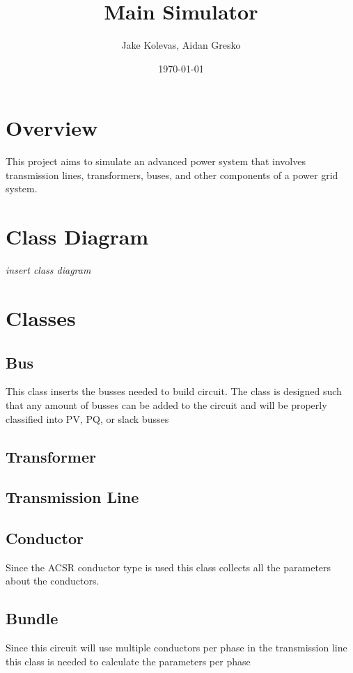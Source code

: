 \documentclass{article}
\author{Jake Kolevas, Aidan Gresko}
\title{Main Simulator}
\date{\today}
\begin{document}
	\maketitle
	
	\section{Overview}
	This project aims to simulate an advanced power system that involves transmission lines, transformers, buses, and other components of a power grid system.
	
	\section{Class Diagram}
	
	\textit{insert class diagram}
	
	\section{Classes}
	
	\subsection{Bus}
	This class inserts the busses needed to build circuit. The class is designed such that any amount of busses can be added to the circuit and will be properly classified into PV, PQ, or slack busses
	
	\subsection{Transformer}
	
	\subsection{Transmission Line}
	
	\subsection{Conductor}
	Since the ACSR conductor type is used this class collects all the parameters about the conductors.
	
	\subsection{Bundle}
	Since this circuit will use multiple conductors per phase in the transmission line this class is needed to calculate the parameters per phase
	
\end{document}

